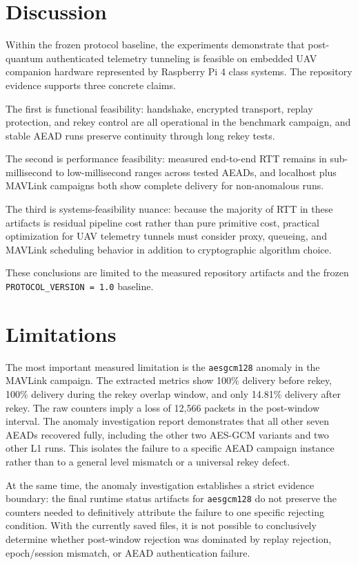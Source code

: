 \documentclass[conference]{IEEEtran}
\begin{document}
\section{Discussion}
Within the frozen protocol baseline, the experiments demonstrate that post-quantum authenticated telemetry tunneling is feasible on embedded UAV companion hardware represented by Raspberry Pi 4 class systems. The repository evidence supports three concrete claims.

The first is functional feasibility: handshake, encrypted transport, replay protection, and rekey control are all operational in the benchmark campaign, and stable AEAD runs preserve continuity through long rekey tests.

The second is performance feasibility: measured end-to-end RTT remains in sub-millisecond to low-millisecond ranges across tested AEADs, and localhost plus MAVLink campaigns both show complete delivery for non-anomalous runs.

The third is systems-feasibility nuance: because the majority of RTT in these artifacts is residual pipeline cost rather than pure primitive cost, practical optimization for UAV telemetry tunnels must consider proxy, queueing, and MAVLink scheduling behavior in addition to cryptographic algorithm choice.

These conclusions are limited to the measured repository artifacts and the frozen \texttt{PROTOCOL\_VERSION = 1.0} baseline.

\section{Limitations}
The most important measured limitation is the \texttt{aesgcm128} anomaly in the MAVLink campaign. The extracted metrics show 100\% delivery before rekey, 100\% delivery during the rekey overlap window, and only 14.81\% delivery after rekey. The raw counters imply a loss of 12,566 packets in the post-window interval. The anomaly investigation report demonstrates that all other seven AEADs recovered fully, including the other two AES-GCM variants and two other L1 runs. This isolates the failure to a specific AEAD campaign instance rather than to a general level mismatch or a universal rekey defect.

At the same time, the anomaly investigation establishes a strict evidence boundary: the final runtime status artifacts for \texttt{aesgcm128} do not preserve the counters needed to definitively attribute the failure to one specific rejecting condition. With the currently saved files, it is not possible to conclusively determine whether post-window rejection was dominated by replay rejection, epoch/session mismatch, or AEAD authentication failure.
\end{document}
